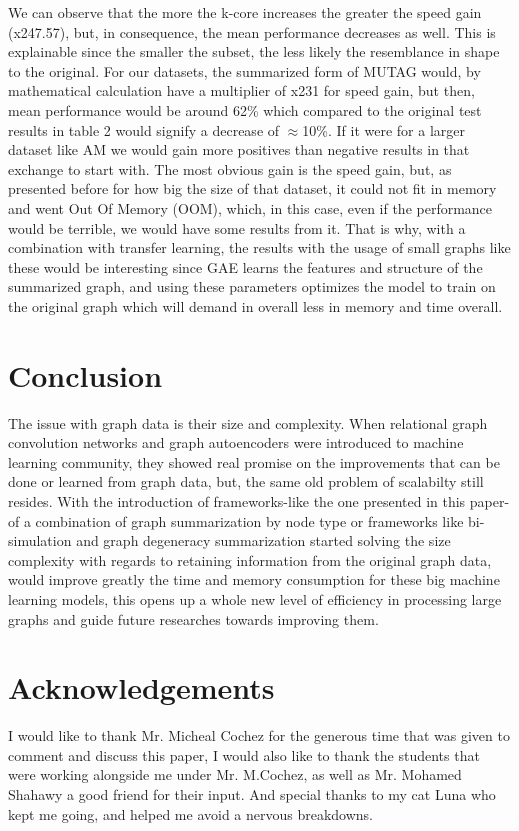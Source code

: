 \documentclass[11pt]{article}
\begin{document}
We can observe that the more the k-core increases the greater the speed gain (x247.57), but, in consequence, the mean performance decreases as well. This is explainable since the smaller the subset, the less likely the resemblance in shape to the original. For our datasets, the summarized form of MUTAG would, by mathematical calculation have a multiplier of x231 for speed gain, but then, mean performance would be around 62\% which compared to the original test results in table 2 would signify a decrease of $\approx$10\%. If it were for a larger dataset like AM we would gain more positives than negative results in that exchange to start with. The most obvious gain is the speed gain, but, as presented before for how big the size of that dataset, it could not fit in memory and went Out Of Memory (OOM), which, in this case, even if the performance would be terrible, we would have some results from it.
That is why, with a combination with transfer learning, the results with the usage of small graphs like these would be interesting since GAE learns the features and structure of the summarized graph, and using these parameters optimizes the model to train on the original graph which will demand in overall less in memory and time overall.

\section{Conclusion}
The issue with graph data is their size and complexity. When relational graph convolution networks and graph autoencoders were introduced to machine learning community, they showed real promise on the improvements that can be done or learned from graph data, but, the same old problem of scalabilty still resides. With the introduction of frameworks-like the one presented in this paper-of a combination of graph summarization by node type or frameworks like bi-simulation and graph degeneracy summarization started solving the size complexity with regards to retaining information from the original graph data, would improve greatly the time and memory consumption for these big machine learning models, this opens up a whole new level of efficiency in processing large graphs and guide future researches towards improving them.

\section*{Acknowledgements}
I would like to thank Mr. Micheal Cochez for the generous time that was given to comment and discuss this paper, I would also like to thank the students that were working alongside me under Mr. M.Cochez, as well as Mr. Mohamed Shahawy a good friend for their input. And special thanks to my cat Luna who kept me going, and helped me avoid a nervous breakdowns.

\printbibliography
\end{document}
